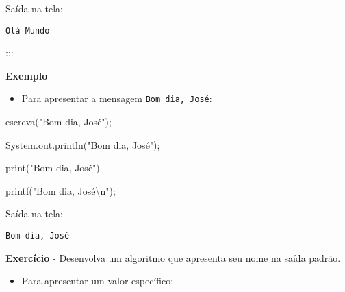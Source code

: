 \documentclass[
  letterpaper,
  DIV=11,
  numbers=noendperiod]{scrreprt}
\newenvironment{Shaded}{\begin{snugshade}}{\end{snugshade}}
\newcommand{\AttributeTok}[1]{\textcolor[rgb]{0.40,0.45,0.13}{#1}}
\newcommand{\BuiltInTok}[1]{\textcolor[rgb]{0.00,0.23,0.31}{#1}}
\newcommand{\FunctionTok}[1]{\textcolor[rgb]{0.28,0.35,0.67}{#1}}
\newcommand{\NormalTok}[1]{\textcolor[rgb]{0.00,0.23,0.31}{#1}}
\newcommand{\OperatorTok}[1]{\textcolor[rgb]{0.37,0.37,0.37}{#1}}
\newcommand{\SpecialCharTok}[1]{\textcolor[rgb]{0.37,0.37,0.37}{#1}}
\newcommand{\StringTok}[1]{\textcolor[rgb]{0.13,0.47,0.30}{#1}}
\providecommand{\tightlist}{%
  \setlength{\itemsep}{0pt}\setlength{\parskip}{0pt}}\usepackage{longtable,booktabs,array}
\begin{document}
Saída na tela:

\begin{verbatim}
Olá Mundo
\end{verbatim}

:::

\textbf{Exemplo}

\begin{itemize}
\tightlist
\item
  Para apresentar a mensagem \texttt{Bom\ dia,\ José}:
\end{itemize}

\begin{Shaded}
\begin{Highlighting}[]
\NormalTok{escreva}\OperatorTok{(}\StringTok{"Bom dia, José"}\OperatorTok{);}
\end{Highlighting}
\end{Shaded}

\begin{Shaded}
\begin{Highlighting}[]
\NormalTok{System}\OperatorTok{.}\AttributeTok{out}\OperatorTok{.}\FunctionTok{println}\NormalTok{(}\StringTok{"Bom dia, José"}\NormalTok{)}\OperatorTok{;}
\end{Highlighting}
\end{Shaded}

\begin{Shaded}
\begin{Highlighting}[]
\BuiltInTok{print}\NormalTok{(}\StringTok{"Bom dia, José"}\NormalTok{)}
\end{Highlighting}
\end{Shaded}

\begin{Shaded}
\begin{Highlighting}[]
\NormalTok{printf}\OperatorTok{(}\StringTok{"Bom dia, José}\SpecialCharTok{\textbackslash{}n}\StringTok{"}\OperatorTok{);}
\end{Highlighting}
\end{Shaded}

Saída na tela:

\begin{verbatim}
Bom dia, José
\end{verbatim}

\textbf{Exercício} - Desenvolva um algoritmo que apresenta seu nome na
saída padrão.

\begin{itemize}
\tightlist
\item
  Para apresentar um valor específico:
\end{itemize}
\end{document}

